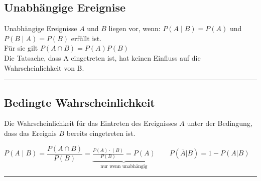 \subsection{Unabhängige Ereignise }
		Unabhängige Ereignisse $A$ und $B$ liegen vor, wenn: \hspace*{5mm} $P(A\mid
		B)=P(A)$ \hspace{4mm} und \hspace{4mm} $P(B\mid A)=P(B)$ \hspace*{5mm} erfüllt
		ist. \\
		Für sie gilt \hspace*{5mm} $P(A\cap B)=P(A)P(B)$\\
    	Die Tatsache, dass A eingetreten ist, hat keinen Einfluss auf die 
		Wahrscheinlichkeit von B.\\
\hrule

\subsection{Bedingte Wahrscheinlichkeit }
Die Wahrscheinlichkeit für das Eintreten des Ereignisses $A$ unter der
Bedingung, dass das Ereignis $B$ bereits eingetreten ist.
\begin{center}
  $P(A\mid B)= \dfrac{P(A\cap B)}{P(B)}=\underbrace{\frac{P(A)\cdot
  (B)}{P(B)}=P(A)}_{\text{nur wenn unabhängig}} \qquad P(\overline{A}|B) = 1 -
  P(A|B)$
\end{center}
\hrule

